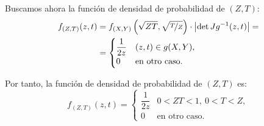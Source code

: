 \documentclass[12pt]{article}
\begin{document}
\begin{ejercicio}
\begin{enumerate}
\begin{figure}[H]
            \end{figure}
    
            Buscamos ahora la función de densidad de probabilidad de $(Z,T)$:
            \begin{align*}
                f_{(Z,T)}(z, t)&=f_{(X,Y)}\left(\sqrt{ZT},\sqrt{\nicefrac{T}{Z}}\right)\cdot \left|\det Jg^{-1}(z,t)\right|
                =\\&= \begin{cases}
                    \dfrac{1}{2z} & (z,t)\in g(X,Y), \\
                    0 & \text{en otro caso}.
                \end{cases}
            \end{align*}
    
            Por tanto, la función de densidad de probabilidad de $(Z,T)$ es:
            \begin{equation*}
                f_{(Z,T)}(z, t) = \begin{cases}
                    \dfrac{1}{2z} & 0<ZT<1,~0<T<Z, \\
                    0 & \text{en otro caso}.
                \end{cases}
            \end{equation*}
    

\end{enumerate}
\end{ejercicio}
\end{document}
